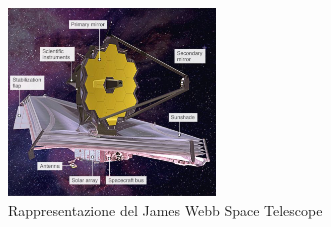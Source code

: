 \begin{figure}
    \centering
    \vspace{-10pt}
    \includegraphics[width=0.49\textwidth]{Immagini/Capitolo2/Jamews_Webb_ST.PNG}
    \caption*{Rappresentazione del James Webb Space Telescope}
    \vspace{-10pt}
\end{figure}

